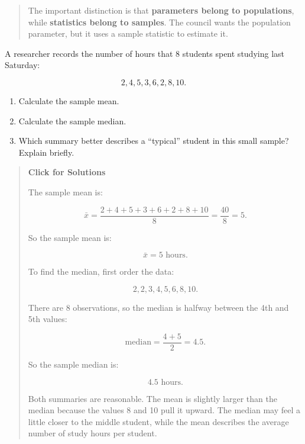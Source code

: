 \documentclass[
  letterpaper,
  DIV=11,
  numbers=noendperiod]{scrreprt}
\providecommand{\tightlist}{%
  \setlength{\itemsep}{0pt}\setlength{\parskip}{0pt}}
\begin{document}
\begin{tcolorbox}
\begin{quote}
The important distinction is that \textbf{parameters belong to
populations}, while \textbf{statistics belong to samples}. The council
wants the population parameter, but it uses a sample statistic to
estimate it.
\end{quote}

\end{tcolorbox}

\begin{tcolorbox}[enhanced jigsaw, arc=.35mm, bottomrule=.15mm, bottomtitle=1mm, breakable, colback=white, colbacktitle=quarto-callout-note-color!10!white, colframe=quarto-callout-note-color-frame, coltitle=black, left=2mm, leftrule=.75mm, opacityback=0, opacitybacktitle=0.6, rightrule=.15mm, title=\textcolor{quarto-callout-note-color}{\faInfo}\hspace{0.5em}{Question 2}, titlerule=0mm, toprule=.15mm, toptitle=1mm]

A researcher records the number of hours that 8 students spent studying
last Saturday:

\[
2,
4,
5,
3,
6,
2,
8,
10.
\]

\begin{enumerate}
\def\labelenumi{\arabic{enumi}.}
\tightlist
\item
  Calculate the sample mean.
\item
  Calculate the sample median.
\item
  Which summary better describes a ``typical'' student in this small
  sample? Explain briefly.
\end{enumerate}

\begin{quote}
\textbf{Click for Solutions}

The sample mean is:

\[
\bar{x}
=
\frac{2+4+5+3+6+2+8+10}{8}
=
\frac{40}{8}
=
5.
\]

So the sample mean is:

\[
\bar{x}=5 \text{ hours}.
\]

To find the median, first order the data:

\[
2,
2,
3,
4,
5,
6,
8,
10.
\]

There are 8 observations, so the median is halfway between the 4th and
5th values:

\[
\text{median}
=
\frac{4+5}{2}
=
4.5.
\]

So the sample median is:

\[
4.5 \text{ hours}.
\]

Both summaries are reasonable. The mean is slightly larger than the
median because the values 8 and 10 pull it upward. The median may feel a
little closer to the middle student, while the mean describes the
average number of study hours per student.
\end{quote}

\end{tcolorbox}
\end{document}

